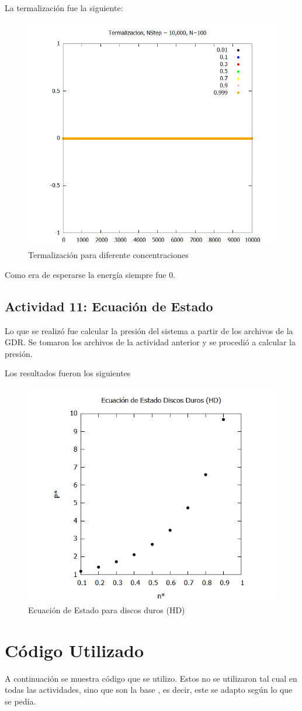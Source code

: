 \documentclass[12pt,letterpaper]{article}
\begin{document}
La termalización fue la siguiente:
\begin{figure}[H]
	\centering
	\includegraphics[width=0.50\linewidth]{TermaT.png}
	\caption{Termalización para diferente concentraciones}
	\label{Term_Cons}
\end{figure}
Como era de esperarse la energía siempre fue 0.


\subsection*{Actividad 11: Ecuación de Estado}

Lo que se realizó fue calcular la presión del sistema a partir de los archivos de la GDR. Se tomaron los archivos de la actividad anterior y se procedió a calcular la presión.

Los resultados fueron los siguientes
\begin{figure}[H]
	\centering
	\includegraphics[width = 0.5\linewidth]{EcEstado.png}
	\caption{Ecuación de Estado para discos duros (HD)}
\end{figure}


\section*{Código Utilizado}
A continuación se muestra código que se utilizo. Estos no se utilizaron tal cual en todas las actividades, sino que son la base , es decir, este se adapto según lo que se pedía.








\end{document}
